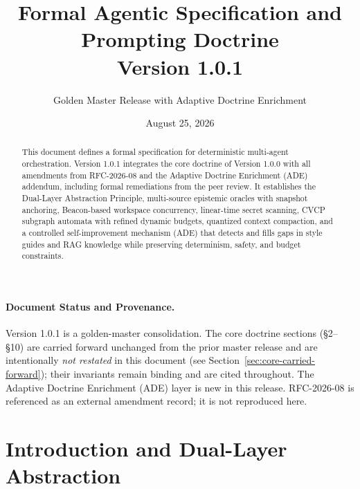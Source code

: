 \documentclass[11pt]{article}
\title{Formal Agentic Specification and Prompting Doctrine\\\Large Version 1.0.1}
\author{Golden Master Release with Adaptive Doctrine Enrichment}
\date{August 25, 2026}
\begin{document}
\maketitle

\begin{abstract}
This document defines a formal specification for deterministic multi-agent orchestration. Version 1.0.1 integrates the core doctrine of Version 1.0.0 with all amendments from RFC-2026-08 and the Adaptive Doctrine Enrichment (ADE) addendum, including formal remediations from the peer review. It establishes the Dual-Layer Abstraction Principle, multi-source epistemic oracles with snapshot anchoring, Beacon-based workspace concurrency, linear-time secret scanning, CVCP subgraph automata with refined dynamic budgets, quantized context compaction, and a controlled self-improvement mechanism (ADE) that detects and fills gaps in style guides and RAG knowledge while preserving determinism, safety, and budget constraints.
\end{abstract}

\paragraph{Document Status and Provenance.}
Version 1.0.1 is a golden-master consolidation. The core doctrine sections
(\S2--\S10) are carried forward unchanged from the prior master release and
are intentionally \emph{not restated} in this document (see
Section~\ref{sec:core-carried-forward}); their invariants remain binding and
are cited throughout. The Adaptive Doctrine Enrichment (ADE) layer is new in
this release. RFC-2026-08 is referenced as an external amendment record; it
is not reproduced here.

\tableofcontents
\newpage


\section{Introduction and Dual-Layer Abstraction}
\end{document}
